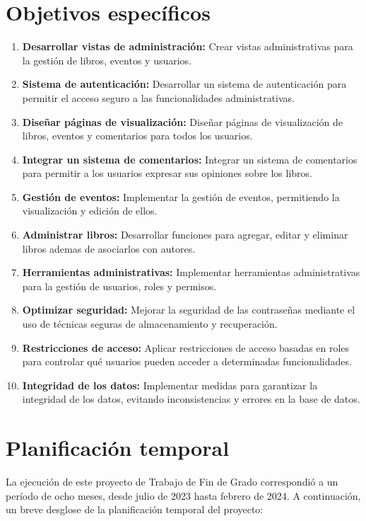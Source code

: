 \documentclass[a4paper, 12pt]{book}
\begin{document}
\section{Objetivos específicos}
\label{sec:objetivos-especificos}
\begin{enumerate}
  \item \textbf{Desarrollar vistas de administración:} Crear vistas administrativas para la gestión de libros, eventos y usuarios.
  \item \textbf{Sistema de autenticación:} Desarrollar un sistema de autenticación para permitir el acceso seguro a las funcionalidades administrativas.
  \item \textbf{Diseñar páginas de visualización:} Diseñar páginas de visualización de libros, eventos y comentarios para todos los usuarios.
  \item \textbf{Integrar un sistema de comentarios:} Integrar un sistema de comentarios para permitir a los usuarios expresar sus opiniones sobre los libros.
  \item \textbf{Gestión de eventos:} Implementar la gestión de eventos, permitiendo la visualización y edición de ellos.
  \item \textbf{Administrar libros:} Desarrollar funciones para agregar, editar y eliminar libros ademas de asociarlos con autores.
  \item \textbf{Herramientas administrativas:} Implementar herramientas administrativas para la gestión de usuarios, roles y permisos.
  \item \textbf{Optimizar seguridad:} Mejorar la seguridad de las contraseñas mediante el uso de técnicas seguras de almacenamiento y recuperación.
  \item \textbf{Restricciones de acceso:} Aplicar restricciones de acceso basadas en roles para controlar qué usuarios pueden acceder a determinadas funcionalidades.
  \item \textbf{Integridad de los datos:} Implementar medidas para garantizar la integridad de los datos, evitando inconsistencias y errores en la base de datos.
\end{enumerate}

\section{Planificación temporal}
\label{sec:planificacion-temporal}
La ejecución de este proyecto de Trabajo de Fin de Grado correspondió a un período de ocho meses, desde julio de 2023 hasta febrero de 2024. A continuación, un breve desglose de la planificación temporal del proyecto:
\end{document}
